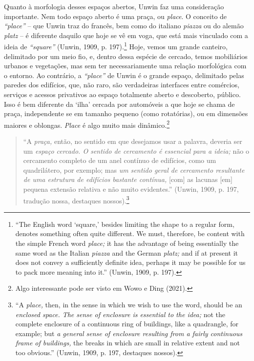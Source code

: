 \documentclass[12pt, a4paper]{book} %
\begin{document}
        Quanto à morfologia desses espaços abertos, Unwin faz uma consideração importante. Nem todo espaço aberto é uma praça, ou \textit{place}. O conceito de \textit{``place''}  – que Unwin traz do francês, bem como do italiano \textit{piazza} ou do alemão \textit{platz} – é diferente daquilo que hoje se vê em voga, que está mais vinculado com a ideia de \textit{``square''} (Unwin, 1909, p. 197).\footnote[61]{``The English word `square,' besides limiting the shape to a regular form, denotes something often quite different. We must, therefore, be content with the simple French word \textit{place;} it has the advantage of being essentially the same word as the Italian \textit{piazza} and the German \textit{platz;} and if at present it does not convey a sufficiently definite idea, perhaps it may be possible for us to pack more meaning into it.'' (Unwin, 1909, p. 197).} Hoje, vemos um grande canteiro, delimitado por um meio fio, e, dentro dessa espécie de cercado, temos mobiliários urbanos e vegetações, mas sem ter necessariamente uma relação morfológica com o entorno. Ao contrário, a \textit{``place''} de Unwin é o grande espaço, delimitado pelas paredes dos edifícios, que, não raro, são verdadeiras interfaces entre comércios, serviços e acessos privativos ao espaço totalmente aberto e descoberto, público. Isso é bem diferente da `ilha' cercada por automóveis a que hoje se chama de praça, independente se em tamanho pequeno (como rotatórias), ou em dimensões maiores e oblongas. \textit{Place} é algo muito mais dinâmico.\footnote[62]{Algo interessante pode ser visto em Wowo e Ding (2021).}

        \begin{quotation}
            ``A \textit{praça,} então, no sentido em que desejamos usar a palavra, deveria ser um \textit{espaço cercado. O sentido de cercamento é essencial para a ideia;} não o cercamento completo de um anel contínuo de edifícios, como um quadrilátero, por exemplo; mas \textit{um sentido geral de cercamento resultante de uma estrutura de edifícios bastante contínua,} [com] as lacunas [em] pequena extensão relativa e não muito evidentes.'' (Unwin, 1909, p. 197, tradução nossa, destaques nossos).\footnote[63]{``A \textit{place,} then, in the sense in which we wish to use the word, should be an \textit{enclosed space. The sense of enclosure is essential to the idea;} not the complete enclosure of a continuous ring of buildings, like a quadrangle, for example; but \textit{a general sense of enclosure resulting from a fairly continuous frame of buildings,} the breaks in which are small in relative extent and not too obvious.'' (Unwin, 1909, p. 197, destaques nossos).}
        \end{quotation}
\end{document}
